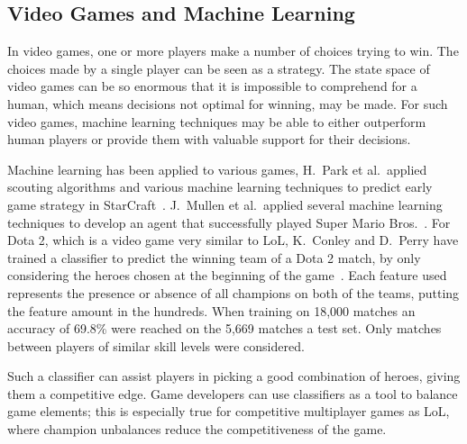 \subsection{Video Games and Machine Learning}\label{sec:mlandonlinevideogames}
In video games, one or more players make a number of choices trying to win. The choices made by a single player can be seen as a strategy. The state space of video games can be so enormous that it is impossible to comprehend for a human, which means decisions not optimal for winning, may be made. For such video games, machine learning techniques may be able to either outperform human players or provide them with valuable support for their decisions.

Machine learning has been applied to various games, H.\ Park et al.\ applied scouting algorithms and various machine learning techniques to predict early game strategy in StarCraft~\cite{Park:2012:PES:2425296.2425298}. J.\ Mullen et al.\ applied several machine learning techniques to develop an agent that successfully played Super Mario Bros.~\cite{supermario}. For Dota 2, which is a video game very similar to LoL, K.\ Conley and D.\ Perry have trained a classifier to predict the winning team of a Dota 2 match, by only considering the heroes chosen at the beginning of the game~\cite{dota2article}. Each feature used represents the presence or absence of all champions on both of the teams, putting the feature amount in the hundreds. When training on 18,000 matches an accuracy of 69.8\% were reached on the 5,669 matches a test set. Only matches between players of similar skill levels were considered. 

Such a classifier can assist players in picking a good combination of heroes, giving them a competitive edge. Game developers can use classifiers as a tool to balance game elements; this is especially true for competitive multiplayer games as LoL, where champion unbalances reduce the competitiveness of the game.

%
%

